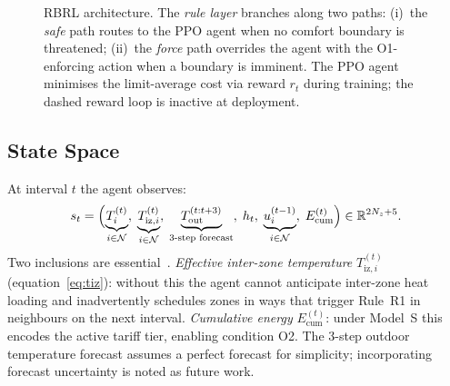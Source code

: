 \documentclass[3p,number]{elsarticle}
\let\oldsubsection\subsection
\renewcommand{\subsection}{\FloatBarrier\oldsubsection}
\newcommand{\Rset}{\mathbb{R}}
\newcommand{\Tout}{T_{\mathrm{out}}}
\newcommand{\Tiz}[1]{T_{\mathrm{iz},#1}}
\begin{document}
\begin{figure}[!t]
{}%
\caption{RBRL architecture.
The \emph{rule layer} branches along two paths: (i)~the \emph{safe} path
routes to the PPO agent when no comfort boundary is threatened; (ii)~the
\emph{force} path overrides the agent with the O1-enforcing action when a
boundary is imminent.
The PPO agent minimises the limit-average cost via reward $r_t$ during
training; the dashed reward loop is inactive at deployment.}
\label{fig:framework}
\end{figure}
 
\subsection{State Space}
\label{subsec:state}
 
At interval $t$ the agent observes:
\begin{equation}
  s_t=\Bigl(
    \underbrace{T_i^{(t)}}_{i\in\mathcal{N}},\;
    \underbrace{\Tiz{i}^{(t)}}_{i\in\mathcal{N}},\;
    \underbrace{\Tout^{(t:t+3)}}_{\text{3-step forecast}},\;
    h_t,\;
    \underbrace{u_i^{(t-1)}}_{i\in\mathcal{N}},\;
    E_{\mathrm{cum}}^{(t)}
  \Bigr)\in\Rset^{2N_z+5}.
  \label{eq:state}
\end{equation}
Two inclusions are essential~\cite{Li2024MZ}.
\emph{Effective inter-zone temperature} $\Tiz{i}^{(t)}$ (equation~\eqref{eq:tiz}): without this the agent cannot anticipate inter-zone heat loading and inadvertently schedules zones in ways that trigger Rule~R1 in neighbours on the next interval.
\emph{Cumulative energy} $E_{\mathrm{cum}}^{(t)}$: under Model~S this encodes the active tariff tier, enabling condition O2.
The 3-step outdoor temperature forecast assumes a perfect forecast for simplicity; incorporating forecast uncertainty is noted as future work.
 
\end{document}
